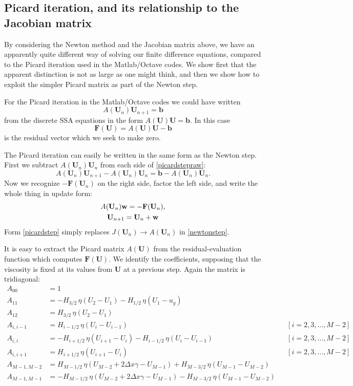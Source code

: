 \documentclass[11pt,final,reqno]{amsart}
\newcommand{\bbF}{\mathbf{F}}
\newcommand{\bU}{\mathbf{U}}
\newcommand{\bb}{\mathbf{b}}
\newcommand{\bw}{\mathbf{w}}
\begin{document}
\subsection*{Picard iteration, and its relationship to the Jacobian matrix} By considering the Newton method and the Jacobian matrix above, we have an apparently quite different way of solving our finite difference equations, compared to the Picard iteration used in the Matlab/Octave codes.  We show first that the apparent distinction is not as large as one might think, and then we show how to exploit the simpler Picard matrix as part of the Newton step.

For the Picard iteration in the Matlab/Octave codes we could have written
\begin{equation}
	A(\bU_n) \bU_{n+1} = \bb \label{picardstepraw}
\end{equation}
from the discrete SSA equations in the form $A(\bU) \bU = \bb$.  In this case
	$$\bbF(\bU) = A(\bU) \bU - \bb$$
is the residual vector which we seek to make zero.

The Picard iteration can easily be written in the same form as the Newton step.  First we subtract $A(\bU_n) \bU_n$ from each side of \eqref{picardstepraw}:
	$$A(\bU_n) \bU_{n+1} - A(\bU_n) \bU_n = \bb - A(\bU_n) \bU_n.$$
Now we recognize $-\bbF(\bU_n)$ on the right side, factor the left side, and write the whole thing in update form:
\begin{gather}
A(\bU_n) \bw = - \bbF(\bU_n), \label{picardstep} \\
\bU_{n+1} = \bU_n + \bw \notag
\end{gather}
Form \eqref{picardstep} simply replaces $J(\bU_n) \to A(\bU_n)$ in \eqref{newtonstep}.

It is easy to extract the Picard matrix $A(\bU)$ from the residual-evaluation function which computes $\bbF(\bU)$.  We identify the coefficients, supposing that the viscosity is fixed at its values from $\bU$ at a previous step.  Again the matrix is tridiagonal:
\begin{align*}
A_{00} &= 1 \\
A_{11} &= - H_{3/2}\, \eta(U_2-U_1) - H_{1/2}\, \eta(U_1-u_g) \\
A_{12} &= H_{3/2}\, \eta(U_2-U_1) \\
A_{i,i-1} &= H_{i-1/2}\, \eta(U_i-U_{i-1}) &&[i=2,3,\dots,M-2] \\
A_{i,i} &= - H_{i+1/2}\, \eta(U_{i+1}-U_i) - H_{i-1/2}\, \eta(U_i-U_{i-1}) &&[i=2,3,\dots,M-2] \\
A_{i,i+1} &= H_{i+1/2}\, \eta(U_{i+1}-U_i)  &&[i=2,3,\dots,M-2] \\
A_{M-1,M-2} &= H_{M-1/2}\, \eta(U_{M-2}+2\Delta x \gamma - U_{M-1}) + H_{M-3/2}\, \eta(U_{M-1}-U_{M-2}) \\
A_{M-1,M-1} &= - H_{M-1/2}\, \eta(U_{M-2}+2\Delta x \gamma - U_{M-1}) - H_{M-3/2}\, \eta(U_{M-1}-U_{M-2})
\end{align*}
\end{document}

